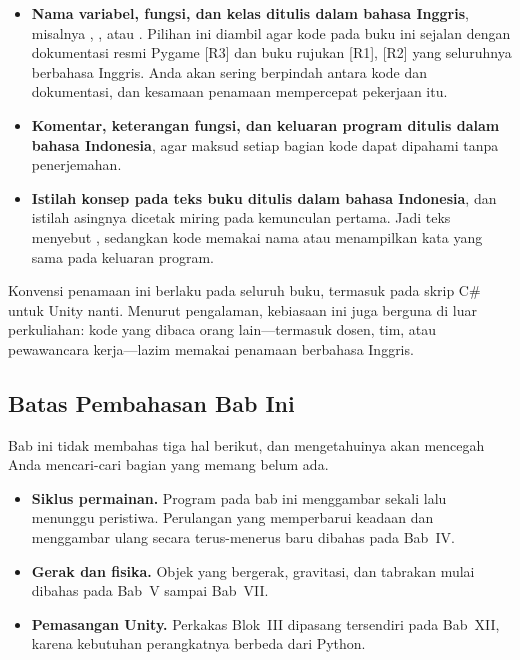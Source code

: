 \begin{itemize}
  \item \textbf{Nama variabel, fungsi, dan kelas ditulis dalam bahasa Inggris},
        misalnya , , atau .
        Pilihan ini diambil agar kode pada buku ini sejalan dengan dokumentasi
        resmi Pygame \mbox{[R3]} dan buku rujukan \mbox{[R1]}, \mbox{[R2]} yang
        seluruhnya berbahasa Inggris. Anda akan sering berpindah antara kode
        dan dokumentasi, dan kesamaan penamaan mempercepat pekerjaan itu.
  \item \textbf{Komentar, keterangan fungsi, dan keluaran program ditulis dalam
        bahasa Indonesia}, agar maksud setiap bagian kode dapat dipahami tanpa
        penerjemahan.
  \item \textbf{Istilah konsep pada teks buku ditulis dalam bahasa Indonesia},
        dan istilah asingnya dicetak miring pada kemunculan pertama. Jadi teks
        menyebut , sedangkan kode memakai nama
         atau menampilkan kata yang sama pada keluaran
        program.
\end{itemize}

Konvensi penamaan ini berlaku pada seluruh buku, termasuk pada skrip C\# untuk
Unity nanti. Menurut pengalaman, kebiasaan ini juga berguna di luar
perkuliahan: kode yang dibaca orang lain---termasuk dosen, tim, atau
pewawancara kerja---lazim memakai penamaan berbahasa Inggris.

\subsection{Batas Pembahasan Bab Ini}

Bab ini tidak membahas tiga hal berikut, dan mengetahuinya akan mencegah Anda
mencari-cari bagian yang memang belum ada.

\begin{itemize}
  \item \textbf{Siklus permainan.} Program pada bab ini menggambar sekali lalu
        menunggu peristiwa. Perulangan yang memperbarui keadaan dan menggambar
        ulang secara terus-menerus baru dibahas pada Bab~IV.
  \item \textbf{Gerak dan fisika.} Objek yang bergerak, gravitasi, dan tabrakan
        mulai dibahas pada Bab~V sampai Bab~VII.
  \item \textbf{Pemasangan Unity.} Perkakas Blok~III dipasang tersendiri pada
        Bab~XII, karena kebutuhan perangkatnya berbeda dari Python.
\end{itemize}
